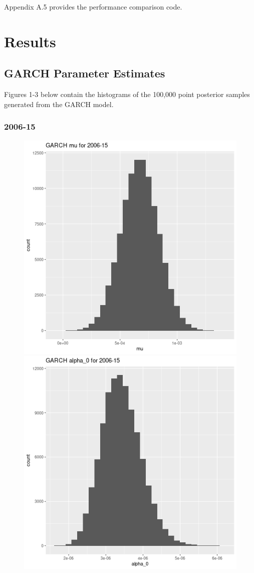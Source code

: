 \documentclass[12pt,letterpaper,reqno,fleqn]{article}
\begin{document}
Appendix A.5 provides the performance comparison code. 

\newpage
\section{Results}

\subsection{GARCH Parameter Estimates}
Figures 1-3 below contain the histograms of the 100,000 point posterior samples generated from the GARCH model.

\subsubsection{2006-15}
\begin{figure}
\includegraphics[scale = .4]{gmu0615}
\includegraphics[scale = .4]{ga00615}

\end{figure}
\end{document}
